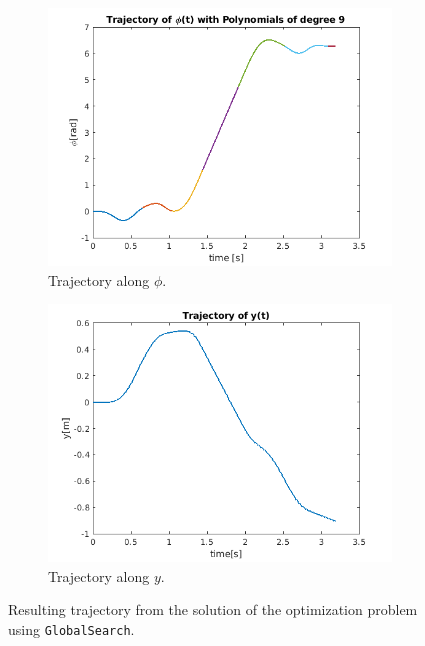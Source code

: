 \documentclass{thesisreport}
\begin{document}
\begin{figure}[h]
\medskip
	\begin{subfigure}{0.45\textwidth}
		\includegraphics[width=\linewidth]{Images/optimization/phi.png}
		\caption{Trajectory along $\phi$.} \label{fig:phi_fmincon}
	\end{subfigure}\hspace*{\fill}
	\begin{subfigure}{0.45\textwidth}
		\includegraphics[width=\linewidth]{Images/optimization/y}
		\caption{Trajectory along $y$.} \label{fig:y_fmincon}
	\end{subfigure}

	\caption{Resulting trajectory from the solution of the optimization problem using \texttt{GlobalSearch}.} \label{fig:trajectory_fmincon}
\end{figure}
\end{document}
